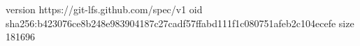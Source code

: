 version https://git-lfs.github.com/spec/v1
oid sha256:b423076ce8b248e983904187c27cadf57ffabd111f1c080751afeb2c104ecefe
size 181696

